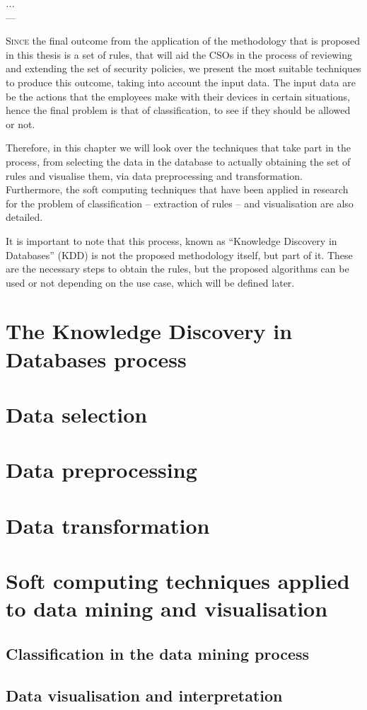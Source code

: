\label{chap:softc} 

\begin{flushright}{\slshape
    ...} \\ \medskip
    --- {}
\end{flushright}

\minitoc\mtcskip
\vfill

\lettrine{S}{ince} the final outcome from the application of the methodology that is proposed in this thesis is a set of rules, that will aid the CSOs in the process of reviewing and extending the set of security policies, we present the most suitable techniques to produce this outcome, taking into account the input data. The input data are be the actions that the employees make with their devices in certain situations, hence the final problem is that of classification, to see if they should be allowed or not.

Therefore, in this chapter we will look over the techniques that take part in the process, from selecting the data in the database to actually obtaining the set of rules and visualise them, via data preprocessing and transformation. Furthermore, the soft computing techniques that have been applied in research for the problem of classification -- extraction of rules -- and visualisation are also detailed.

It is important to note that this process, known as ``Knowledge Discovery in Databases'' (KDD) is not the proposed methodology itself, but part of it. These are the necessary steps to obtain the rules, but the proposed algorithms can be used or not depending on the use case, which will be defined later.

\section{The Knowledge Discovery in Databases process}

\cite{fayyad1996data}

\section{Data selection}

\section{Data preprocessing}

\section{Data transformation}

\section{Soft computing techniques applied to data mining and visualisation}

\subsection{Classification in the data mining process}

\subsection{Data visualisation and interpretation}